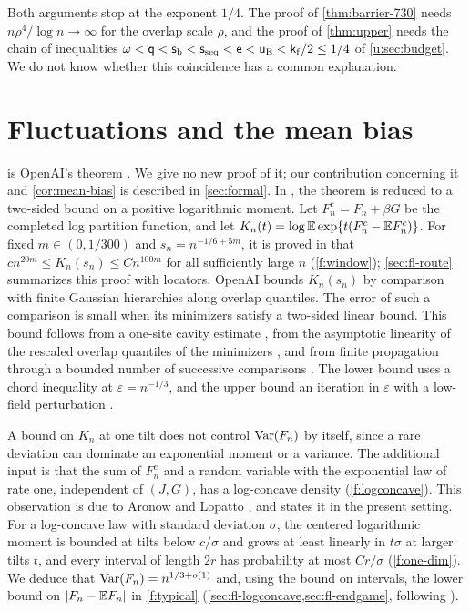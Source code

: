 Both arguments stop at the exponent $1/4$. The proof of
\cref{thm:barrier-730} needs $n\rho^4/\log n\to\infty$ for the overlap scale
$\rho$, and the proof of \cref{thm:upper} needs the chain of inequalities
$\omega<\mathsf{q}<\mathsf{s}_{\rm b}<\mathsf{s}_{\rm seq}<\mathsf{e}<\mathsf{u}_{\rm E}
<\mathsf{k}_{\rm f}/2\le1/4$ of \cref{u:sec:budget}. We do not know whether this
coincidence has a common explanation.


\section{Fluctuations and the mean bias}\label{sec:ov-fluct}

 is OpenAI's theorem \cite[Theorem~1.1]{oai-fluctuations}. We
give no new proof of it; our contribution concerning it and
\cref{cor:mean-bias} is described in \cref{sec:formal}. In
\cite{oai-fluctuations}, the theorem is reduced to a two-sided bound on a positive logarithmic moment. Let $F_n^c=F_n+\beta G$ be
the completed log partition function, and let $K_n(t)=\log\mathbb E\exp\{t(F_n^c-\mathbb E F_n^c)\}$.
For fixed $m\in(0,1/300)$ and $s_n=n^{-1/6+5m}$, it is proved in
\cite[Proposition~7.5]{oai-fluctuations} that
$cn^{20m}\le K_n(s_n)\le Cn^{100m}$ for all sufficiently large $n$
(\cref{f:window}); \cref{sec:fl-route} summarizes this proof with locators.
OpenAI bounds $K_n(s_n)$ by comparison with finite Gaussian hierarchies along
overlap quantiles. The error
of such a comparison is small when its minimizers satisfy a two-sided linear
bound. This bound follows from a one-site cavity estimate
\cite[Proposition~4.1]{oai-fluctuations}, from the asymptotic linearity of the
rescaled overlap quantiles of the minimizers
\cite[Theorem~5.1]{oai-fluctuations}, and from finite propagation through a bounded number of successive comparisons
\cite[Proposition~6.6]{oai-fluctuations}. The lower bound uses a chord
inequality at $\varepsilon=n^{-1/3}$, and the upper bound an iteration in
$\varepsilon$ with a low-field perturbation
\cite[Sections~7.1--7.4]{oai-fluctuations}.

A bound on $K_n$ at one tilt does not control $\operatorname{Var}(F_n)$ by itself, since a
rare deviation can dominate an exponential moment or a variance. The additional
input is that the sum of $F_n^c$ and a random variable with the exponential law
of rate one, independent of $(J,G)$, has a log-concave density
(\cref{f:logconcave}). This observation is
due to Aronow and Lopatto \cite[Proposition~5.1]{quantitative-parisi}, and
\cite[Lemma~7.6]{oai-fluctuations} states it in the present setting. For a
log-concave law with standard deviation $\sigma$, the centered logarithmic
moment is bounded at tilts below $c/\sigma$ and grows at least linearly in
$t\sigma$ at larger tilts $t$, and every interval of length $2r$ has
probability at most $Cr/\sigma$ (\cref{f:one-dim}). We deduce that
$\operatorname{Var}(F_n)=n^{1/3+o(1)}$ and, using the bound on intervals, the lower bound on
$\lvert F_n-\mathbb E F_n\rvert$ in \eqref{f:typical} (\cref{sec:fl-logconcave,sec:fl-endgame},
following \cite[Sections~7.5 and~7.6]{oai-fluctuations}).

